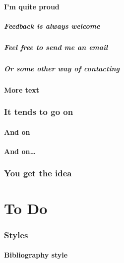 \documentclass[12pt,a4paper]{csum}
\begin{document}
        \subsection{I'm quite proud}
        \lipsum[]
            \subsubsection{Feedback is always welcome}
            \lipsum[]
            \subsubsection{Feel free to send me an email}
            \lipsum[]
            \subsubsection{Or some other way of contacting}
            \lipsum[]
        \subsection{More text}
        \lipsum[]
    \section{It tends to go on}
        \lipsum[]
        \subsection{And on}
        \lipsum[]
        \subsection{And on\ldots}
        \lipsum[]
    \section{You get the idea}
    \lipsum[]
\part{To Do}

    \section{Styles}

        \subsection{Bibliography style}
        \lipsum[]
\end{document}
